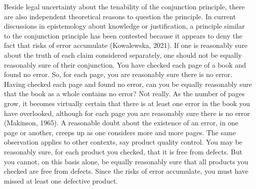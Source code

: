 \documentclass[
  10pt,
  dvipsnames,enabledeprecatedfontcommands]{scrartcl}
\begin{document}
Beside legal uncertainty about the tenability of the conjunction
principle, there are also independent theoretical reasons to question
the principle. In current discussions in epistemology about knowledge or
justification, a principle similar to the conjunction principle has been
contested because it appears to deny the fact that risks of error
accumulate (Kowalewska, 2021). If one is reasonably sure about the truth
of each claim considered separately, one should not be equally
reasonably sure of their conjunction. You have checked each page of a
book and found no error. So, for each page, you are reasonably sure
there is no error. Having checked each page and found no error, can you
be equally reasonably sure that the book as a whole contains no error?
Not really. As the number of pages grow, it becomes virtually certain
that there is at least one error in the book you have overlooked,
although for each page you are reasonably sure there is no error
(Makinson, 1965). A reasonable doubt about the existence of an error, in
one page or another, creeps up as one considers more and more pages. The
same observation applies to other contexts, say product quality control.
You may be reasonably sure, for each product you checked, that it is
free from defects. But you cannot, on this basis alone, be equally
reasonably sure that all products you checked are free from defects.
Since the risks of error accumulate, you must have missed at least one
defective product.
\end{document}

